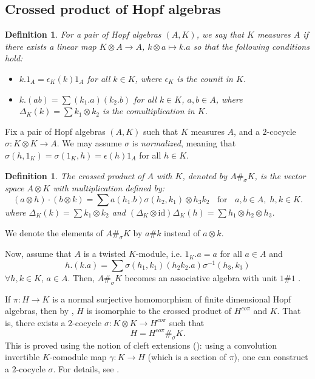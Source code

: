 \documentclass{amsart}
\theoremstyle{plain}%
\newtheorem{definition}[lemma]{Definition}
\theoremstyle{remark}
\newcommand{\1}{\mathbbm{1}}
\newcommand{\id}{\mathrm{id}}
\newcommand{\eps}{\epsilon}
\begin{document}
  \subsection{Crossed product of Hopf algebras}\label{ssec:crossed_prod}
        \begin{definition}
            For a pair of Hopf algebras $(A,K)$, we say that $K$ {\it measures} $A$ if there exists a linear map $K\otimes A\to A$, $k\otimes a\mapsto k. a$ so that the following conditions hold:
        \begin{itemize}
            \item $k. 1_A = \eps_K(k)1_A$ for all $k\in K$, where $\eps_K$ is the counit in $K$.
            \item $k. (ab) = \sum (k_1. a)(k_2. b)$ for all $k\in K$, $a,b\in A$, where $\Delta_K (k) = \sum k_1\otimes k_2$ is the comultiplication in $K$.
        \end{itemize}
        \end{definition}
        

        Fix a pair of Hopf algebras $(A,K)$ such that $K$ measures $A$, and a $2$-cocycle $\sigma: K\otimes K\to A$. We may assume $\sigma$ is {\it normalized}, meaning that $\sigma(h,1_K) = \sigma(1_K,h) = \eps(h)1_A$ for all $h\in K$.
        \begin{definition}
             The {\it crossed product} of $A$ with $K$, denoted by $A\#_\sigma K$, is the  vector space $A\otimes K$ with multiplication defined by:
        $$
            (a\otimes h)\cdot (b\otimes k) = \sum a(h_1.b)\sigma(h_2, k_1)\otimes h_3k_2 \;\; \text{ for }\;\; a,b\in A, \;h,k\in K.
        $$
        where $\Delta_K (k) = \sum k_1\otimes k_2$ and $(\Delta_K\otimes \id)\Delta_K(h)=\sum h_1\otimes h_2\otimes h_3 $.
        \end{definition}
        We denote the elements of $A\#_\sigma K$ by $a\#k$ instead of $a\otimes k$. 
        
        Now, assume that $A$ is a twisted $K$-module, i.e. $1_K. a = a$ for all $a\in A$ and 
        $$
            h.(k.a) = \sum \sigma(h_1,k_1)(h_2k_2.a)\sigma^{-1}(h_3,k_3)
        $$
        $\forall h,k\in K$,  $a\in A$. Then, $A\#_\sigma K$ becomes an associative algebra with unit $1\#1$ \cite[Lemma 7.1.2]{M}.
       
        If $\pi:H\to K$ is a normal surjective homomorphism of finite dimensional Hopf algebras, then by \cite{Sch}, $H$ is isomorphic to the crossed product of $H^{co \pi}$ and $K$. That is, there exists a $2$-cocycle $\sigma:K\otimes K\to H^{co \pi}$ such that $$H=H^{co \pi}\#_{\sigma}K.$$  
        This is proved using the notion of cleft extensions (\cite[Definition 7.2.1]{M}): using a convolution invertible $K$-comodule map $\gamma:K\to H$ (which is a section of $\pi$), one can construct a $2$-cocycle $\sigma$. For details, see \cite[\S7.2]{M}.
        
\end{document}
